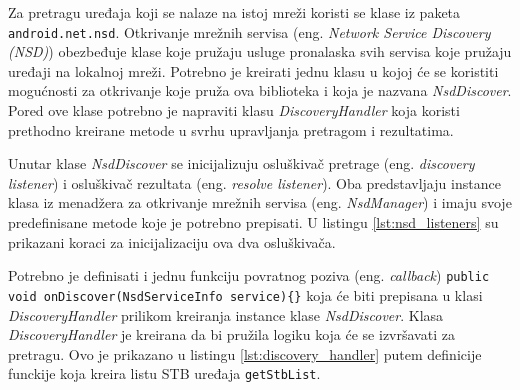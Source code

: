 \documentclass[struktura.tex]{subfiles}
\begin{document}
Za pretragu uređaja koji se nalaze na istoj mreži koristi se klase iz paketa \verb|android.net.nsd|. Otkrivanje mrežnih servisa (eng. \textit{Network Service Discovery (NSD)}) \cite{sajt:nsd} obezbeđuje klase koje pružaju usluge pronalaska svih servisa koje pružaju uređaji na lokalnoj mreži. Potrebno je kreirati jednu klasu u kojoj će se koristiti mogućnosti za otkrivanje koje pruža ova biblioteka i koja je nazvana \textit{NsdDiscover}. Pored ove klase potrebno je napraviti klasu \textit{DiscoveryHandler} koja koristi prethodno kreirane metode u svrhu upravljanja pretragom i rezultatima.

Unutar klase \textit{NsdDiscover} se inicijalizuju osluškivač pretrage (eng. \textit{discovery listener}) i osluškivač rezultata (eng. \textit{resolve listener}). Oba predstavljaju instance klasa iz menadžera za otkrivanje mrežnih servisa (eng. \textit{NsdManager}) i imaju svoje predefinisane metode koje je potrebno prepisati. U listingu \ref{lst:nsd_listeners} su prikazani koraci za inicijalizaciju ova dva osluškivača. 



Potrebno je definisati i jednu funkciju povratnog poziva (eng. \textit{callback}) \verb|public void onDiscover(NsdServiceInfo service){}| koja će biti prepisana u klasi \textit{DiscoveryHandler} prilikom kreiranja instance klase \textit{NsdDiscover}. Klasa \textit{DiscoveryHandler} je kreirana da bi pružila logiku koja će se izvršavati za pretragu. Ovo je prikazano u listingu \ref{lst:discovery_handler} putem definicije funckije koja kreira listu STB uređaja \verb|getStbList|.


\end{document}
